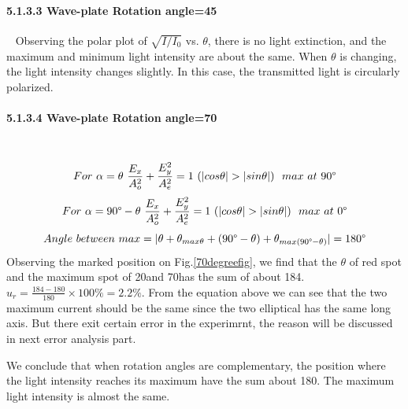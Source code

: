 \documentclass[12pt,a4paper]{article}
\begin{document}
\paragraph{5.1.3.3 Wave-plate Rotation angle=45\degree}~{} \newline
Observing the polar plot of $\sqrt{I/I_0}$ vs. $\theta$, there is no light extinction, and the maximum and minimum light intensity are about the same. When $\theta$ is changing, the light intensity changes slightly. In this case, the transmitted light is circularly polarized.
\paragraph{5.1.3.4 Wave-plate Rotation angle=70\degree}~{} \newline
$$For~\alpha=\theta~\frac{E_x}{A_o^2}+\frac{E_y^2}{A_e^2}=1~(|cos\theta|>|sin\theta|) ~~max~at~90\degree$$ 
$$For~\alpha=90\degree-\theta~ \frac{E_x}{A_o^2}+\frac{E_y^2}{A_e^2}=1~(|cos\theta|>|sin\theta|) ~~max~at~0\degree$$ 
$$Angle~between~max=|\theta+\theta_{max\theta}+(90\degree-\theta)+\theta_{max(90\degree-\theta)}|=180\degree$$
Observing the marked position on Fig.\ref{70degreefig}, we find that the $\theta$ of red spot and the maximum spot of 20\degree and 70\degree has the sum of about 184\degree. $u_r=\frac{184-180}{180}\times 100\%=2.2\%$. From the equation above we can see that the two maximum current should be the same since the two elliptical has the same long axis. But there exit certain error in the experimrnt, the reason will be discussed in next error analysis part.\par 
We conclude that when rotation angles are complementary, the position where the light intensity reaches its maximum have the sum about 180\degree. The maximum light intensity is almost the same. \par
\end{document}
